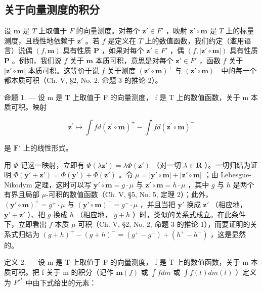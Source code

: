 \subsection{关于向量测度的积分}

设 \(\mathbf{m}\) 是 \(T\) 上取值于 \(F\) 的向量测度。对每个 \(\mathbf{z}' \in F'\) ，映射 \(\mathbf{z}' \circ \mathbf{m}\) 是 \(T\) 上的标量测度，且线性地依赖于 \(\mathbf{z}'\) 。若 \(f\) 是定义在 \(T\) 上的数值函数，我们约定（滥用语言）说偶 \((f, \mathbf{m})\) 具有性质 \(\boldsymbol{P}\) ，如果对每个 \(\mathbf{z}' \in F'\) ，偶 \((f, |\mathbf{z}' \circ \mathbf{m}|)\) 具有性质 \(\boldsymbol{P}\) 。例如，我们说 \(f\) 关于 \(\mathbf{m}\) 本质可积，意思是对每个 \(\mathbf{z}' \in F'\) ，函数 \(f\) 关于 \(|\mathbf{z}' \circ \mathbf{m}|\) 本质可积。这等价于说 \(f\) 关于测度 \((\mathbf{z}' \circ \mathbf{m})^+\) 与 \((\mathbf{z}' \circ \mathbf{m})^-\) 中的每一个都本质可积（Ch. V, §2, No. 2, 命题 3 的推论 2）。

命题 1. --- 设 m 是 T 上取值于 F 的向量测度， f 是 T 上的数值函数，关于 m 本质可积。映射

\[
\mathbf {z} ^ {\prime} \mapsto \int f d (\mathbf {z} ^ {\prime} \circ \mathbf {m}) ^ {+} - \int f d (\mathbf {z} ^ {\prime} \circ \mathbf {m}) ^ {-}
\]

是 \(\mathbf{F}'\) 上的线性形式。

用 \(\Phi\) 记这一映射，立即有 \(\Phi(\lambda\mathbf{z}') = \lambda\Phi(\mathbf{z}')\) （对一切 \(\lambda \in \mathbf{R}\) ）。一切归结为证明 \(\Phi(\mathbf{y}' + \mathbf{z}') = \Phi(\mathbf{y}') + \Phi(\mathbf{z}')\) 。令 \(\mu = |\mathbf{y}' \circ \mathbf{m}| + |\mathbf{z}' \circ \mathbf{m}|\) ；由 Lebesgue-Nikodym 定理，这时可以写 \(\mathbf{y}' \circ \mathbf{m} = g \cdot \mu\) 与 \(\mathbf{z}' \circ \mathbf{m} = h \cdot \mu\) ，其中 \(g\) 与 \(h\) 是两个有界且局部 \(\mu\)-可积的数值函数（Ch. V, §5, No. 5, 定理 2）；此外， \((\mathbf{y}' \circ \mathbf{m})^+ = g^+ \cdot \mu\) 与 \((\mathbf{y}' \circ \mathbf{m})^- = g^- \cdot \mu\) ，并且当把 \(\mathbf{y}'\) 换成 \(\mathbf{z}'\) （相应地， \(\mathbf{y}' + \mathbf{z}'\) ）、把 \(g\) 换成 \(h\) （相应地， \(g + h\) ）时，类似的关系式成立。在此条件下，立即看出 \(f\) 本质 \(\mu\)-可积（Ch. V, §2, No. 2, 命题 3 的推论 1），而要证明的关系式归结为 \((g + h)^+ - (g + h)^- = (g^+ - g^-) + (h^+ - h^-)\) ，这是显然的。

定义 2. --- 设 m 是 T 上取值于 F 的向量测度， f 是 T 上的数值函数，关于 m 本质可积。把 f 关于 m 的积分（记作 \(\mathbf{m}(f)\) 或 \(\int f dm\) 或 \(\int f(t) dm(t)\) ）定义为 \(F'^{*}\) 中由下式给出的元素：

